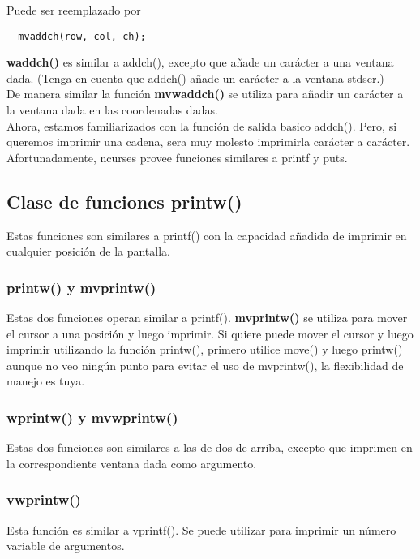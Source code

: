\documentclass{article}
\begin{document}
Puede ser reemplazado por

\begin{verbatim}
  mvaddch(row, col, ch);
\end{verbatim}

\textbf{waddch()} es similar a addch(), excepto que añade un carácter a una ventana
dada. (Tenga en cuenta que addch() añade un carácter a la ventana stdscr.)\\

De manera similar la función \textbf{mvwaddch()} se utiliza para añadir un carácter a la
ventana dada en las coordenadas dadas.\\

Ahora, estamos familiarizados con la función de salida basico addch(). Pero, si
queremos imprimir una cadena, sera muy molesto imprimirla carácter a carácter.
Afortunadamente, ncurses provee funciones similares a printf y puts.

\subsection{Clase de funciones printw()}%
Estas funciones son similares a printf() con la capacidad añadida de imprimir
en cualquier posición de la pantalla.

\subsubsection{printw() y mvprintw()}%
Estas dos funciones operan similar a printf(). \textbf{mvprintw()} se utiliza para mover
el cursor a una posición y luego imprimir. Si quiere puede mover el cursor y
luego imprimir utilizando la función printw(), primero utilice move() y luego
printw() aunque no veo ningún punto para evitar el uso de mvprintw(), la
flexibilidad de manejo es tuya.

\subsubsection{wprintw() y mvwprintw()}%
Estas dos funciones son similares a las de dos de arriba, excepto que imprimen
en la correspondiente ventana dada como argumento.

\subsubsection{vwprintw()}%
Esta función es similar a vprintf(). Se puede utilizar para imprimir un número
variable de argumentos.
\end{document}
